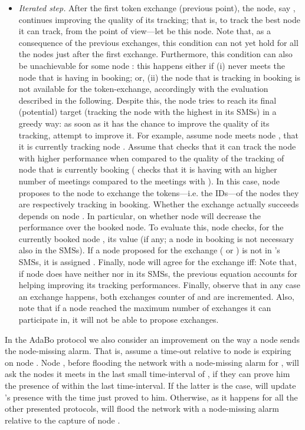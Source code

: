 \documentclass{IEEEconf}
\begin{document}
\begin{itemize}
\item \textit{Iterated step.} After the first token exchange (previous point), the node, say , continues improving the quality of its tracking; that is, to track the best node it can track, from the  point of view---let  be this node.
Note that, as a consequence of the previous exchanges, this condition can not yet hold for all the nodes just after the first exchange. Furthermore, this condition can also be unachievable for some node : this happens either if (i)  never meets the node that is having  in booking; or, (ii) the node that is tracking  in booking is not available for the token-exchange, accordingly with the evaluation described in the following.
Despite this, the node  tries to reach its final (potential) target (tracking the node with the highest  in its SMSs) in a greedy way:
as soon as it has the chance to improve the quality of its tracking,  attempt to improve it. For example, assume node  meets node ,
that it is currently tracking node .
Assume that  checks that it can track the node  with higher performance when compared to the quality of the tracking of node  that is currently booking ( checks that it is having with  an higher number of meetings compared to the meetings with ). In this case, node  proposes to the node  to exchange the tokens---i.e. the IDs---of the nodes they are respectively tracking in booking. Whether the exchange actually succeeds depends
on node . In particular, on whether node  will decrease the performance over the booked node. To evaluate this, node  checks, for the currently booked node , its  value (if any; a node in booking is not necessary also in the SMSs). If a node proposed for the exchange ( or ) is not in 's SMSs, it is assigned . Finally, node  will agree for the exchange iff:  Note that, if node  does have neither    nor  in its SMSs, the previous equation accounts for  helping  improving its tracking performances.
Finally, observe that in any case an exchange happens, both exchanges counter of  and  are incremented. Also, note that if a node reached the maximum number of exchanges it can participate in, it will not be able to propose exchanges.
\end{itemize}

In the AdaBo protocol we also consider an improvement on the way a node sends the node-missing alarm. That is, assume a time-out  relative to node  is expiring on node . Node , before flooding the network with a node-missing alarm for , will ask the nodes it meets in the last small time-interval  of , if they can prove him the  presence of  within the last  time-interval. If the latter is the case,  will update 's presence with the time just proved to him. Otherwise, as it happens for all the other  presented protocols,   will flood the network with a node-missing alarm relative to the capture of node .
\end{document}
